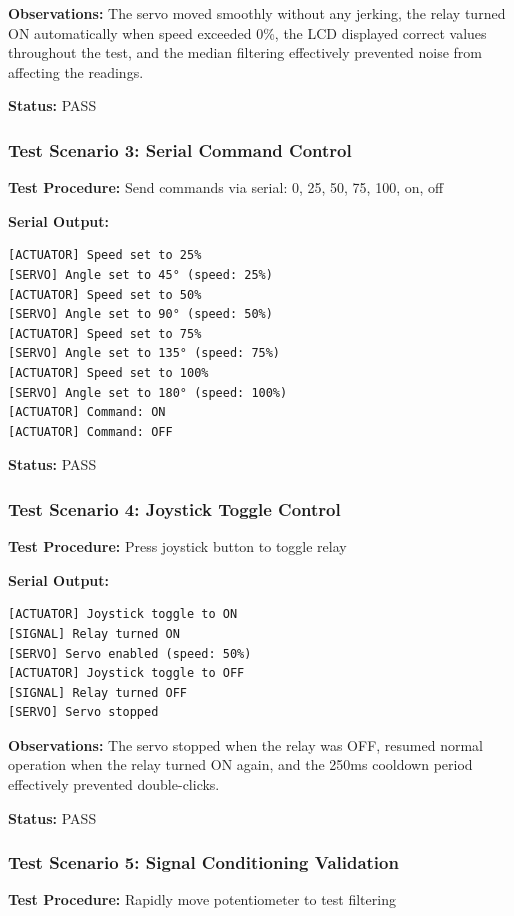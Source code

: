 \documentclass[12pt]{article}
\begin{document}
\textbf{Observations:} The servo moved smoothly without any jerking, the relay turned ON automatically when speed exceeded 0\%, the LCD displayed correct values throughout the test, and the median filtering effectively prevented noise from affecting the readings.

\textbf{Status:} PASS

\subsubsection*{Test Scenario 3: Serial Command Control}

\textbf{Test Procedure:} Send commands via serial: 0, 25, 50, 75, 100, on, off

\textbf{Serial Output:}
\begin{verbatim}
[ACTUATOR] Speed set to 25%
[SERVO] Angle set to 45° (speed: 25%)
[ACTUATOR] Speed set to 50%
[SERVO] Angle set to 90° (speed: 50%)
[ACTUATOR] Speed set to 75%
[SERVO] Angle set to 135° (speed: 75%)
[ACTUATOR] Speed set to 100%
[SERVO] Angle set to 180° (speed: 100%)
[ACTUATOR] Command: ON
[ACTUATOR] Command: OFF
\end{verbatim}

\textbf{Status:} PASS

\subsubsection*{Test Scenario 4: Joystick Toggle Control}

\textbf{Test Procedure:} Press joystick button to toggle relay

\textbf{Serial Output:}
\begin{verbatim}
[ACTUATOR] Joystick toggle to ON
[SIGNAL] Relay turned ON
[SERVO] Servo enabled (speed: 50%)
[ACTUATOR] Joystick toggle to OFF
[SIGNAL] Relay turned OFF
[SERVO] Servo stopped
\end{verbatim}

\textbf{Observations:} The servo stopped when the relay was OFF, resumed normal operation when the relay turned ON again, and the 250ms cooldown period effectively prevented double-clicks.

\textbf{Status:} PASS

\subsubsection*{Test Scenario 5: Signal Conditioning Validation}

\textbf{Test Procedure:} Rapidly move potentiometer to test filtering
\end{document}
